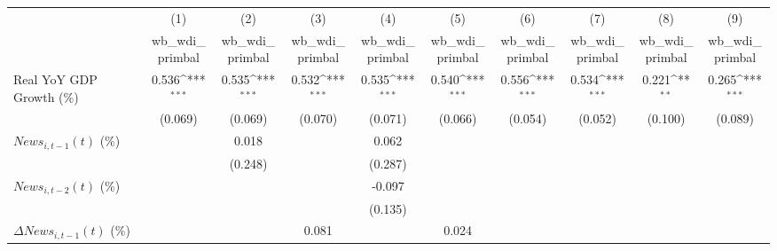 {
\def\sym#1{\ifmmode^{#1}\else\(^{#1}\)\fi}
\begin{tabular}{l*{9}{c}}
\toprule
                    &\multicolumn{1}{c}{(1)}&\multicolumn{1}{c}{(2)}&\multicolumn{1}{c}{(3)}&\multicolumn{1}{c}{(4)}&\multicolumn{1}{c}{(5)}&\multicolumn{1}{c}{(6)}&\multicolumn{1}{c}{(7)}&\multicolumn{1}{c}{(8)}&\multicolumn{1}{c}{(9)}\\
                    &\multicolumn{1}{c}{wb_wdi_primbal}&\multicolumn{1}{c}{wb_wdi_primbal}&\multicolumn{1}{c}{wb_wdi_primbal}&\multicolumn{1}{c}{wb_wdi_primbal}&\multicolumn{1}{c}{wb_wdi_primbal}&\multicolumn{1}{c}{wb_wdi_primbal}&\multicolumn{1}{c}{wb_wdi_primbal}&\multicolumn{1}{c}{wb_wdi_primbal}&\multicolumn{1}{c}{wb_wdi_primbal}\\
\midrule
Real YoY GDP Growth (\%)&       0.536\sym{***}&       0.535\sym{***}&       0.532\sym{***}&       0.535\sym{***}&       0.540\sym{***}&       0.556\sym{***}&       0.534\sym{***}&       0.221\sym{**} &       0.265\sym{***}\\
                    &     (0.069)         &     (0.069)         &     (0.070)         &     (0.071)         &     (0.066)         &     (0.054)         &     (0.052)         &     (0.100)         &     (0.089)         \\
\addlinespace
$ News_{i,t-1}(t)$ (\%)&                     &       0.018         &                     &       0.062         &                     &                     &                     &                     &                     \\
                    &                     &     (0.248)         &                     &     (0.287)         &                     &                     &                     &                     &                     \\
\addlinespace
$ News_{i,t-2}(t)$ (\%)&                     &                     &                     &      -0.097         &                     &                     &                     &                     &                     \\
                    &                     &                     &                     &     (0.135)         &                     &                     &                     &                     &                     \\
\addlinespace
$ \Delta News_{i,t-1}(t)$ (\%)&                     &                     &       0.081         &                     &       0.024         &                     &                     &                     &                     \\

\end{tabular}}
